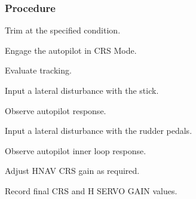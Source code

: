 \subsubsection*{Procedure}
 \begin{compactenum}
    \item Trim at the specified condition.
    \item Engage the autopilot in CRS Mode.
    \item Evaluate tracking.
    \item Input a lateral disturbance with the stick.  
    \item Observe autopilot response.
    \item Input a lateral disturbance with the rudder pedals.  
    \item Observe autopilot inner loop response.
    \item Adjust HNAV CRS gain as required.
    \item Record final CRS and H SERVO GAIN values.
    \end{compactenum}
